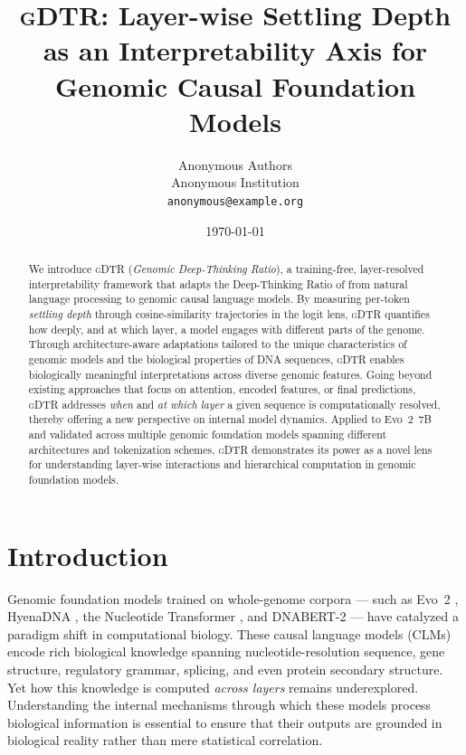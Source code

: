 \documentclass[12pt]{article}
\title{\textsc{gDTR}: Layer-wise Settling Depth as an Interpretability
       Axis for Genomic Causal Foundation Models}
\author{Anonymous Authors\\ Anonymous Institution \\
        \texttt{anonymous@example.org}}
\date{\today}
\theoremstyle{plain}
\theoremstyle{definition}
\theoremstyle{remark}
\newcommand{\gDTR}{\textsc{gDTR}}
\begin{document}
\maketitle

\begin{abstract}
We introduce \gDTR{} (\emph{Genomic Deep-Thinking Ratio}), a training-free,
layer-resolved interpretability framework that adapts the
Deep-Thinking Ratio of \citet{chen2026deepthinking} from natural language
processing to genomic causal language models. By measuring per-token
\emph{settling depth} through cosine-similarity trajectories in the
logit lens, \gDTR{} quantifies how deeply, and at which layer, a model
engages with different parts of the genome. Through architecture-aware
adaptations tailored to the unique characteristics of genomic models and
the biological properties of DNA sequences, \gDTR{} enables biologically
meaningful interpretations across diverse genomic features. Going beyond
existing approaches that focus on attention, encoded features, or final
predictions, \gDTR{} addresses \emph{when} and \emph{at which layer} a
given sequence is computationally resolved, thereby offering a new
perspective on internal model dynamics. Applied to Evo~2~7B
\cite{nguyen2026evo2} and validated across multiple genomic foundation
models spanning different architectures and tokenization schemes,
\gDTR{} demonstrates its power as a novel lens for understanding
layer-wise interactions and hierarchical computation in genomic
foundation models.
\end{abstract}

\section{Introduction}
\label{sec:intro}

Genomic foundation models trained on whole-genome corpora --- such as
Evo~2 \cite{nguyen2026evo2}, HyenaDNA \cite{nguyen2023hyenadna},
the Nucleotide Transformer \cite{dallatorre2024nt}, and DNABERT-2
\cite{zhou2024dnabert2} --- have catalyzed a paradigm shift in
computational biology. These causal language models (CLMs) encode
rich biological knowledge spanning nucleotide-resolution sequence,
gene structure, regulatory grammar, splicing, and even protein
secondary structure. Yet how this knowledge is computed
\emph{across layers} remains underexplored. Understanding the internal
mechanisms through which these models process biological information is
essential to ensure that their outputs are grounded in biological
reality rather than mere statistical correlation.
\end{document}
